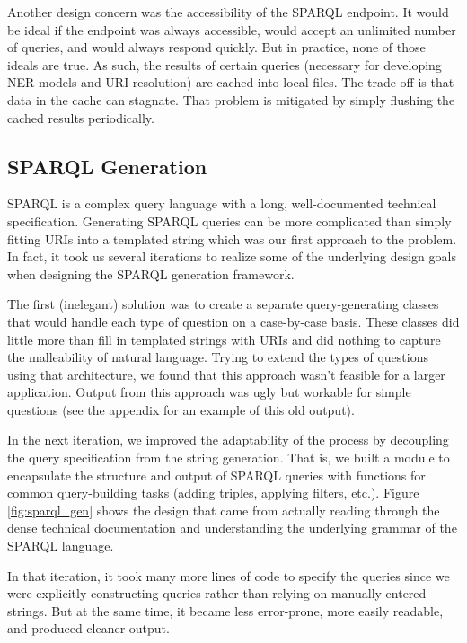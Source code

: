 \documentclass[11pt]{article}
\begin{document}
Another design concern was the accessibility of the SPARQL endpoint.
It would be ideal if the endpoint was always accessible, would accept an unlimited
number of queries, and would always respond quickly. But in practice, none of
those ideals are true. As such, the results of certain queries
(necessary for developing NER models and URI resolution) are cached into local files.
The trade-off is that data in the cache can stagnate. That problem is mitigated by 
simply flushing the cached results periodically.

\subsection{SPARQL Generation}
\label{section:sparql_gen}
SPARQL is a complex query language with a long, well-documented 
technical specification\cite{sparql, sparql11}. Generating SPARQL queries can be
more complicated than simply fitting URIs into a templated string which was our
first approach to the problem. In fact, it took us several iterations to realize
some of the underlying design goals when designing the SPARQL generation framework.

The first (inelegant) solution was to create a separate query-generating
classes that would handle each type of question on a case-by-case basis.
These classes did little more than fill in templated strings with URIs and did
nothing to capture the malleability of natural language.
Trying to extend the types of questions using that architecture, we found that
this approach wasn't feasible for a larger application.
Output from this approach was ugly but workable for simple questions (see the
appendix for an example of this old output).

In the next iteration, we improved the adaptability of the process by 
decoupling the query specification from the string generation. 
That is, we built a module to encapsulate the structure and output of SPARQL
queries with functions for common query-building tasks (adding triples, 
applying filters, etc.). Figure \ref{fig:sparql_gen} shows the design that came from
actually reading through the dense technical documentation and understanding the
underlying grammar of the SPARQL language.

In that iteration, it took many more lines of code to specify the queries since
we were explicitly constructing queries rather than relying on manually
entered strings. But at the same time, it became less error-prone, more
easily readable, and produced cleaner output.
\end{document}
